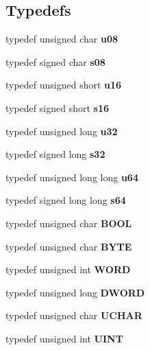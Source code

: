 \subsection*{Typedefs}
\begin{CompactItemize}
\item 
typedef unsigned char \textbf{u08}\label{avrlibtypes_8h_4a020a9446b094e07e53376ac939a64d}

\item 
typedef signed char \textbf{s08}\label{avrlibtypes_8h_2af4bef1788406b159040be6837d0410}

\item 
typedef unsigned short \textbf{u16}\label{avrlibtypes_8h_9e6c91d77e24643b888dbd1a1a590054}

\item 
typedef signed short \textbf{s16}\label{avrlibtypes_8h_5ffa4f640862b25ba6d4f635b78bdbe1}

\item 
typedef unsigned long \textbf{u32}\label{avrlibtypes_8h_2caf5cd7bcdbe1eefa727f44ffb10bac}

\item 
typedef signed long \textbf{s32}\label{avrlibtypes_8h_dafe97a8e4be18b0198f234819016582}

\item 
typedef unsigned long long \textbf{u64}\label{avrlibtypes_8h_d758b7a5c3f18ed79d2fcd23d9f16357}

\item 
typedef signed long long \textbf{s64}\label{avrlibtypes_8h_4258bfb2c3a440d06c4aaa3c2b450dde}

\item 
typedef unsigned char \textbf{BOOL}\label{avrlibtypes_8h_67bb6a3d7ee6a2a5950ce437abbe31c8}

\item 
typedef unsigned char \textbf{BYTE}\label{avrlibtypes_8h_4ae1dab0fb4b072a66584546209e7d58}

\item 
typedef unsigned int \textbf{WORD}\label{avrlibtypes_8h_d2baa11c897721ff6f14b452b547f9bc}

\item 
typedef unsigned long \textbf{DWORD}\label{avrlibtypes_8h_d342ac907eb044443153a22f964bf0af}

\item 
typedef unsigned char \textbf{UCHAR}\label{avrlibtypes_8h_4f4bb67531a9bf6f0b9c6ad76aeba587}

\item 
typedef unsigned int \textbf{UINT}\label{avrlibtypes_8h_36cb3b01d81ffd844bbbfb54003e06ec}


\end{CompactItemize}
